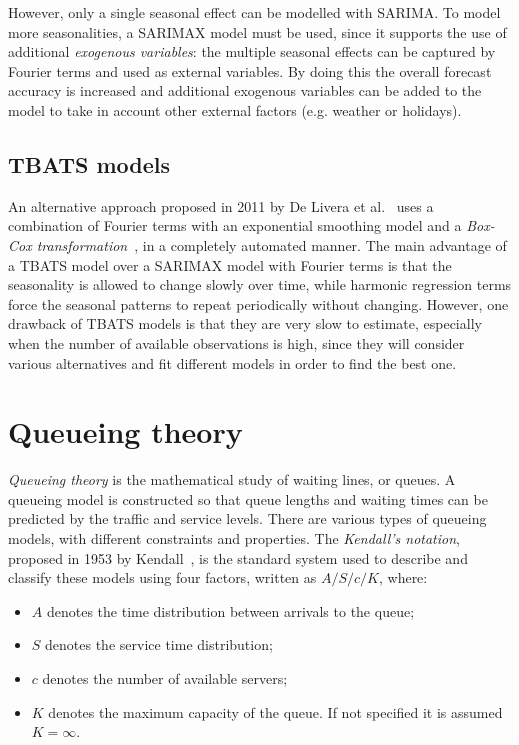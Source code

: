 However, only a single seasonal effect can be modelled with SARIMA. To model more seasonalities, a SARIMAX model must be used, since it supports the use of additional \emph{exogenous variables}: the multiple seasonal effects can be captured by Fourier terms and used as external variables. By doing this the overall forecast accuracy is increased and additional exogenous variables can be added to the model to take in account other external factors (e.g. weather or holidays).

\subsection{TBATS models}
\label{subsec:tbats_models}

An alternative approach proposed in 2011 by De Livera et al.~\cite{de_livera} uses a combination of Fourier terms with an exponential smoothing model and a \emph{Box-Cox transformation}~\cite{box}, in a completely automated manner. The main advantage of a TBATS model over a SARIMAX model with Fourier terms is that the seasonality is allowed to change slowly over time, while harmonic regression terms force the seasonal patterns to repeat periodically without changing. However, one drawback of TBATS models is that they are very slow to estimate, especially when the number of available observations is high, since they will consider various alternatives and fit different models in order to find the best one.

\section{Queueing theory}
\label{sec:queueing_theory}

\emph{Queueing theory} is the mathematical study of waiting lines, or queues. A queueing model is constructed so that queue lengths and waiting times can be predicted by the traffic and service levels. There are various types of queueing models, with different constraints and properties. The \emph{Kendall's notation}, proposed in 1953 by Kendall~\cite{kendall}, is the standard system used to describe and classify these models using four factors, written as \( A/S/c/K \), where:
\begin{itemize}
  \item \( A \) denotes the time distribution between arrivals to the queue;
  \item \( S \) denotes the service time distribution;
  \item \( c \) denotes the number of available servers;
  \item \( K \) denotes the maximum capacity of the queue. If not specified it is assumed \( K = \infty \).
\end{itemize}

